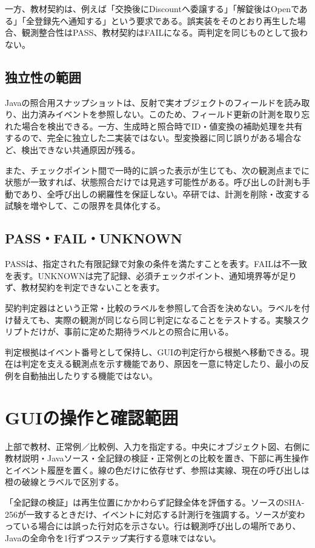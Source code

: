 \documentclass[a4paper,11pt]{ltjsarticle}
\newcommand{\code}[1]{\texttt{\detokenize{#1}}}
\begin{document}
一方、教材契約は、例えば「交換後にDiscountへ委譲する」「解錠後はOpenである」「全登録先へ通知する」という要求である。誤実装をそのとおり再生した場合、観測整合性はPASS、教材契約はFAILになる。両判定を同じものとして扱わない。

\subsection{独立性の範囲}
Javaの照合用スナップショットは、反射で実オブジェクトのフィールドを読み取り、出力済みイベントを参照しない。このため、フィールド更新の計測を取り忘れた場合を検出できる。一方、生成時と照合時でID・値変換の補助処理を共有するので、完全に独立した二実装ではない。型変換器に同じ誤りがある場合など、検出できない共通原因が残る。

また、チェックポイント間で一時的に誤った表示が生じても、次の観測点までに状態が一致すれば、状態照合だけでは見逃す可能性がある。呼び出しの計測も手動であり、全呼び出しの網羅性を保証しない。卒研では、計測を削除・改変する試験を増やして、この限界を具体化する。

\subsection{PASS・FAIL・UNKNOWN}
PASSは、指定された有限記録で対象の条件を満たすことを表す。FAILは不一致を表す。UNKNOWNは完了記録、必須チェックポイント、通知境界等が足りず、教材契約を判定できないことを表す。

契約判定器は\code{variant}という正常・比較のラベルを参照して合否を決めない。ラベルを付け替えても、実際の観測が同じなら同じ判定になることをテストする。実験スクリプトだけが、事前に定めた期待ラベルとの照合に用いる。

判定根拠はイベント番号として保持し、GUIの判定行から根拠へ移動できる。現在は判定を支える観測点を示す機能であり、原因を一意に特定したり、最小の反例を自動抽出したりする機能ではない。
\clearpage

\section{GUIの操作と確認範囲}
上部で教材、正常例／比較例、入力を指定する。中央にオブジェクト図、右側に教材説明・Javaソース・全記録の検証・正常例との比較を置き、下部に再生操作とイベント履歴を置く。線の色だけに依存せず、参照は実線、現在の呼び出しは橙の破線とラベルで区別する。

「全記録の検証」は再生位置にかかわらず記録全体を評価する。ソースのSHA-256が一致するときだけ、イベントに対応する計測行を強調する。ソースが変わっている場合には誤った行対応を示さない。行は観測呼び出しの場所であり、Javaの全命令を1行ずつステップ実行する意味ではない。
\end{document}
